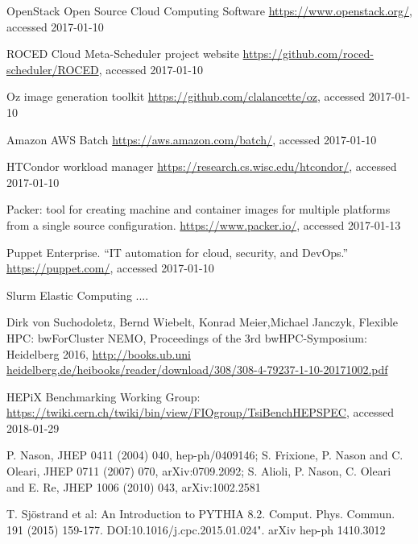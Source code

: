 \begin{thebibliography}{}
%
%
OpenStack Open Source Cloud Computing Software
\url{https://www.openstack.org/}, accessed 2017-01-10

ROCED Cloud Meta-Scheduler project website
\url{https://github.com/roced-scheduler/ROCED}, accessed 2017-01-10

Oz image generation toolkit
\url{https://github.com/clalancette/oz}, accessed 2017-01-10

Amazon AWS Batch
\url{https://aws.amazon.com/batch/}, accessed 2017-01-10

HTCondor workload manager
\url{https://research.cs.wisc.edu/htcondor/}, accessed 2017-01-10


Packer: tool for creating machine and container images for multiple platforms from a single source configuration. 
\url{https://www.packer.io/}, accessed 2017-01-13


Puppet Enterprise. ``IT automation for cloud, security, and DevOps.''
\url{https://puppet.com/}, accessed 2017-01-10

Slurm Elastic Computing ....


Dirk von Suchodoletz, Bernd Wiebelt, Konrad Meier,Michael Janczyk,
  Flexible HPC: bwForCluster NEMO, 
Proceedings of the 3rd bwHPC-Symposium: Heidelberg 2016, \url{http://books.ub.uni
heidelberg.de/heibooks/reader/download/308/308-4-79237-1-10-20171002.pdf}

 HEPiX Benchmarking Working Group:
\url{https://twiki.cern.ch/twiki/bin/view/FIOgroup/TsiBenchHEPSPEC}, accessed 2018-01-29

   P. Nason, JHEP 0411 (2004) 040, hep-ph/0409146;
    S. Frixione, P. Nason and C. Oleari, JHEP 0711 (2007) 070, arXiv:0709.2092;
    S. Alioli, P. Nason, C. Oleari and E. Re, JHEP 1006 (2010) 043, arXiv:1002.2581

    
T. Sjöstrand et al: An Introduction to PYTHIA 8.2. Comput. Phys. Commun. 191 (2015) 159-177. DOI:10.1016/j.cpc.2015.01.024". arXiv hep-ph 1410.3012




\end{thebibliography}
